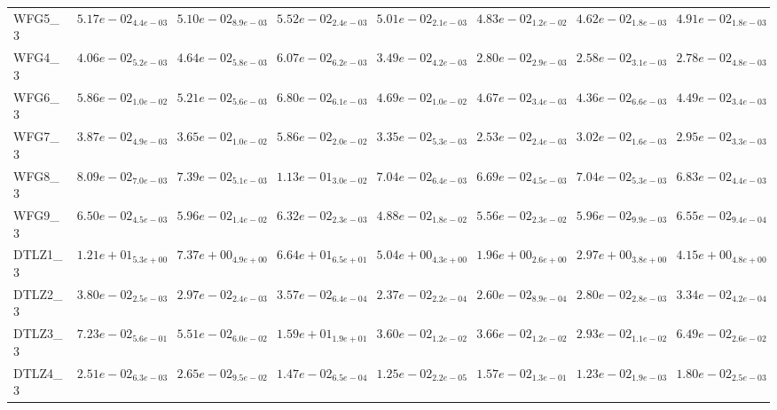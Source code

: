 \documentclass{article}
\begin{document}
\begin{landscape}
\begin{table}
\begin{scriptsize}
\begin{tabular}{llllllll}
WFG5\_3 & $  5.17e-02_{ 4.4e-03}$ & $  5.10e-02_{ 8.9e-03}$ & $  5.52e-02_{ 2.4e-03}$ & $  5.01e-02_{ 2.1e-03}$ & \cellcolor{gray25}$  4.83e-02_{ 1.2e-02}$ & \cellcolor{gray95}$  4.62e-02_{ 1.8e-03}$ & $  4.91e-02_{ 1.8e-03}$ \\
WFG4\_3 & $  4.06e-02_{ 5.2e-03}$ & $  4.64e-02_{ 5.8e-03}$ & $  6.07e-02_{ 6.2e-03}$ & $  3.49e-02_{ 4.2e-03}$ & $  2.80e-02_{ 2.9e-03}$ & \cellcolor{gray95}$  2.58e-02_{ 3.1e-03}$ & \cellcolor{gray25}$  2.78e-02_{ 4.8e-03}$ \\
WFG6\_3 & $  5.86e-02_{ 1.0e-02}$ & $  5.21e-02_{ 5.6e-03}$ & $  6.80e-02_{ 6.1e-03}$ & $  4.69e-02_{ 1.0e-02}$ & $  4.67e-02_{ 3.4e-03}$ & \cellcolor{gray95}$  4.36e-02_{ 6.6e-03}$ & \cellcolor{gray25}$  4.49e-02_{ 3.4e-03}$ \\
WFG7\_3 & $  3.87e-02_{ 4.9e-03}$ & $  3.65e-02_{ 1.0e-02}$ & $  5.86e-02_{ 2.0e-02}$ & $  3.35e-02_{ 5.3e-03}$ & \cellcolor{gray95}$  2.53e-02_{ 2.4e-03}$ & $  3.02e-02_{ 1.6e-03}$ & \cellcolor{gray25}$  2.95e-02_{ 3.3e-03}$ \\
WFG8\_3 & $  8.09e-02_{ 7.0e-03}$ & $  7.39e-02_{ 5.1e-03}$ & $  1.13e-01_{ 3.0e-02}$ & $  7.04e-02_{ 6.4e-03}$ & \cellcolor{gray95}$  6.69e-02_{ 4.5e-03}$ & $  7.04e-02_{ 5.3e-03}$ & \cellcolor{gray25}$  6.83e-02_{ 4.4e-03}$ \\
WFG9\_3 & $  6.50e-02_{ 4.5e-03}$ & $  5.96e-02_{ 1.4e-02}$ & $  6.32e-02_{ 2.3e-03}$ & \cellcolor{gray95}$  4.88e-02_{ 1.8e-02}$ & \cellcolor{gray25}$  5.56e-02_{ 2.3e-02}$ & $  5.96e-02_{ 9.9e-03}$ & $  6.55e-02_{ 9.4e-04}$ \\
DTLZ1\_3 & $  1.21e+01_{ 5.3e+00}$ & $  7.37e+00_{ 4.9e+00}$ & $  6.64e+01_{ 6.5e+01}$ & $  5.04e+00_{ 4.3e+00}$ & \cellcolor{gray95}$  1.96e+00_{ 2.6e+00}$ & \cellcolor{gray25}$  2.97e+00_{ 3.8e+00}$ & $  4.15e+00_{ 4.8e+00}$ \\
DTLZ2\_3 & $  3.80e-02_{ 2.5e-03}$ & $  2.97e-02_{ 2.4e-03}$ & $  3.57e-02_{ 6.4e-04}$ & \cellcolor{gray95}$  2.37e-02_{ 2.2e-04}$ & \cellcolor{gray25}$  2.60e-02_{ 8.9e-04}$ & $  2.80e-02_{ 2.8e-03}$ & $  3.34e-02_{ 4.2e-04}$ \\
DTLZ3\_3 & $  7.23e-02_{ 5.6e-01}$ & $  5.51e-02_{ 6.0e-02}$ & $  1.59e+01_{ 1.9e+01}$ & \cellcolor{gray25}$  3.60e-02_{ 1.2e-02}$ & $  3.66e-02_{ 1.2e-02}$ & \cellcolor{gray95}$  2.93e-02_{ 1.1e-02}$ & $  6.49e-02_{ 2.6e-02}$ \\
DTLZ4\_3 & $  2.51e-02_{ 6.3e-03}$ & $  2.65e-02_{ 9.5e-02}$ & $  1.47e-02_{ 6.5e-04}$ & \cellcolor{gray25}$  1.25e-02_{ 2.2e-05}$ & $  1.57e-02_{ 1.3e-01}$ & \cellcolor{gray95}$  1.23e-02_{ 1.9e-03}$ & $  1.80e-02_{ 2.5e-03}$ \\

\end{tabular}
\end{scriptsize}
\end{table}
\end{landscape}
\end{document}
